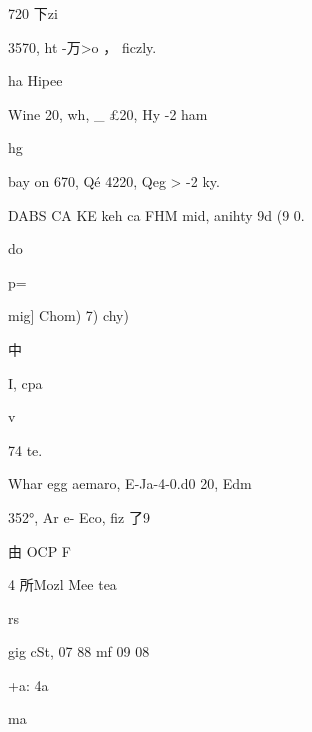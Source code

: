\documentclass[UTF8,12pt,a4paper,openany]{ctexbook}
\begin{document}
\begin{enumerate}[label=\textbf{\arabic*.},leftmargin=2em]
720 下zi\par 3570,  ht -万>o ， ficzly.\par ha Hipee\par Wine 20, wh,       \_ £20, Hy -2 ham\par hg\par bay          on       670,  Qé 4220, Qeg > -2 ky.\par DABS CA KE keh ca FHM mid, anihty 9d (9 0.\par do\par p=\par mig] Chom)            7) chy)\par 中\par I, cpa\par v\par 74          te.\par Whar egg aemaro, E-Ja-4-0.d0 20, Edm\par 352°,  Ar e- Eco,  fiz 了9\par 由 OCP F\par 4     所Mozl Mee tea\par rs\par gig cSt, 07 88 mf 09 08\par +a:                     4a\par ma               
\end{enumerate}
\end{document}
